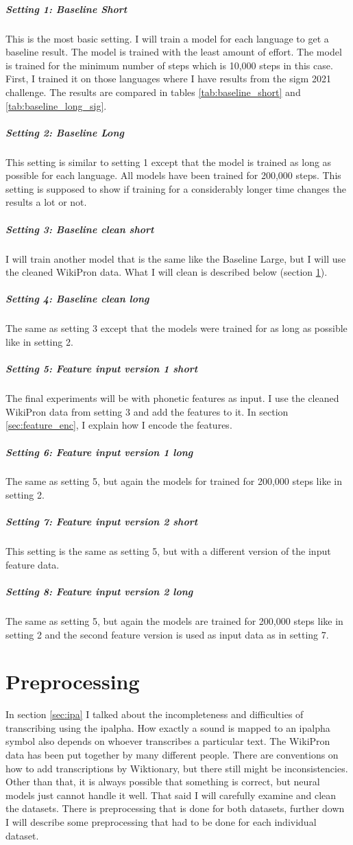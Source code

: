 \subparagraph{Setting 1: Baseline Short}
This is the most basic setting. I will train a model for each language to get a baseline result. The model is trained with the least amount of effort. The model is trained for the minimum number of steps which is 10,000 steps in this case. First, I trained it on those languages where I have results from the \ac{sigm} 2021 challenge. The results are compared in tables \ref{tab:baseline_short} and \ref{tab:baseline_long_sig}.

\subparagraph{Setting 2: Baseline Long}
This setting is similar to setting 1 except that the model is trained as long as possible for each language. All models have been trained for 200,000 steps. This setting is supposed to show if training for a considerably longer time changes the results a lot or not.

\subparagraph{Setting 3: Baseline clean short}
I will train another model that is the same like the Baseline Large, but I will use the cleaned WikiPron data. What I will clean is described below (section \ref{preprocess}).

\subparagraph{Setting 4: Baseline clean long}
The same as setting 3 except that the models were trained for as long as possible like in setting 2.

\subparagraph{Setting 5: Feature input version 1 short}
The final experiments will be with phonetic features as input. I use the cleaned WikiPron data from setting 3 and add the features to it. In section \ref{sec:feature_enc}, I explain how I encode the features. 

\subparagraph{Setting 6: Feature input version 1 long}
The same as setting 5, but again the models for trained for 200,000 steps like in setting 2.

\subparagraph{Setting 7: Feature input version 2 short}
This setting is the same as setting 5, but with a different version of the input feature data.

\subparagraph{Setting 8: Feature input version 2 long}
The same as setting 5, but again the models are trained for 200,000 steps like in setting 2 and the second feature version is used as input data as in setting 7.

\section{Preprocessing}
\label{preprocess}
In section \ref{sec:ipa} I talked about the incompleteness and difficulties of transcribing using the \ac{ipalpha}. How exactly a sound is mapped to an \ac{ipalpha} symbol also depends on whoever transcribes a particular text. The WikiPron data has been put together by many different people. There are conventions on how to add transcriptions by Wiktionary, but there still might be inconsistencies. Other than that, it is always possible that something is correct, but neural models just cannot handle it well. That said I will carefully examine and clean the datasets. There is preprocessing that is done for both datasets, further down I will describe some preprocessing that had to be done for each individual dataset.

